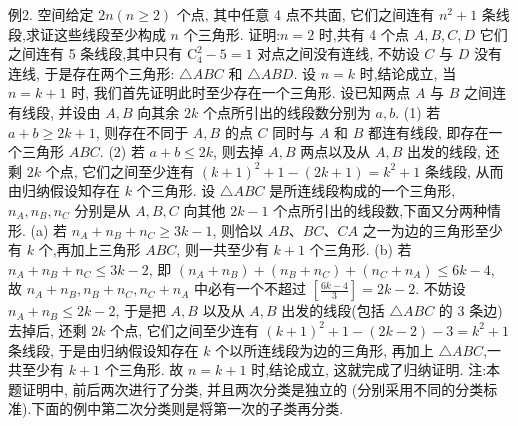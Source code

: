 例2. 空间给定 $2 n(n \geqslant 2)$ 个点, 其中任意 4 点不共面, 它们之间连有 $n^2+1$ 条线段,求证这些线段至少构成 $n$ 个三角形.
证明:$n=2$ 时,共有 4 个点 $A, B, C, D$ 它们之间连有 5 条线段,其中只有 $\mathrm{C}_4^2-5=1$ 对点之间没有连线, 不妨设 $C$ 与 $D$ 没有连线, 于是存在两个三角形: $\triangle A B C$ 和 $\triangle A B D$.
设 $n=k$ 时,结论成立, 当 $n=k+1$ 时, 我们首先证明此时至少存在一个三角形.
设已知两点 $A$ 与 $B$ 之间连有线段, 并设由 $A, B$ 向其余 $2 k$ 个点所引出的线段数分别为 $a, b$.
(1) 若 $a+b \geqslant 2 k+1$, 则存在不同于 $A, B$ 的点 $C$ 同时与 $A$ 和 $B$ 都连有线段, 即存在一个三角形 $A B C$.
(2) 若 $a+b \leqslant 2 k$, 则去掉 $A, B$ 两点以及从 $A, B$ 出发的线段, 还剩 $2 k$ 个点, 它们之间至少连有 $(k+1)^2+1-(2 k+1)=k^2+1$ 条线段, 从而由归纳假设知存在 $k$ 个三角形.
设 $\triangle A B C$ 是所连线段构成的一个三角形, $n_A, n_B, n_C$ 分别是从 $A, B, C$ 向其他 $2 k-1$ 个点所引出的线段数,下面又分两种情形.
(a) 若 $n_A+n_B+n_C \geqslant 3 k-1$, 则恰以 $A B 、 B C 、 C A$ 之一为边的三角形至少有 $k$ 个,再加上三角形 $A B C$, 则一共至少有 $k+1$ 个三角形.
(b) 若 $n_A+n_B+n_C \leqslant 3 k-2$, 即 $\left(n_A+n_B\right)+\left(n_B+n_C\right)+\left(n_C+n_A\right) \leqslant 6 k-4$, 故 $n_A+n_B, n_B+n_C, n_C+n_A$ 中必有一个不超过 $\left[\frac{6 k-4}{3}\right]=2 k-2$. 不妨设 $n_A+n_B \leqslant 2 k-2$, 于是把 $A, B$ 以及从 $A, B$ 出发的线段(包括 $\triangle A B C$ 的 3 条边) 去掉后, 还剩 $2 k$ 个点, 它们之间至少连有 $(k+1)^2+1-(2 k-2)- 3=k^2+1$ 条线段, 于是由归纳假设知存在 $k$ 个以所连线段为边的三角形, 再加上 $\triangle A B C$,一共至少有 $k+1$ 个三角形.
故 $n=k+1$ 时,结论成立, 这就完成了归纳证明.
注:本题证明中, 前后两次进行了分类, 并且两次分类是独立的 (分别采用不同的分类标准).下面的例中第二次分类则是将第一次的子类再分类.



